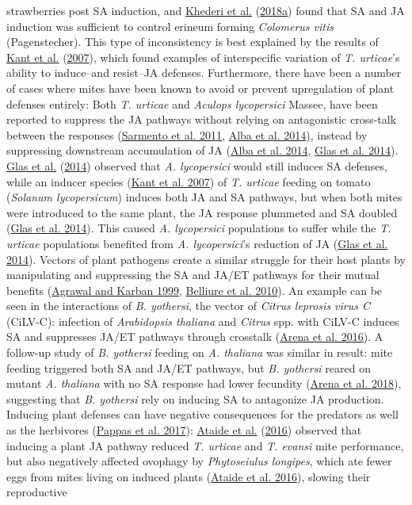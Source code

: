 \documentclass[12pt,final,CPage]{ufthesis}
\begin{document}
{strawberries post SA induction, and \protect\hyperlink{ref-Khederi2018}{Khederi et al.} (\protect\hyperlink{ref-Khederi2018}{2018a}) found that SA and JA induction was sufficient to control erineum forming \emph{Colomerus vitis} (Pagenstecher). This type of inconsistency is best explained by the results of \protect\hyperlink{ref-Kant2007}{Kant et al.} (\protect\hyperlink{ref-Kant2007}{2007}), which found examples of interspecific variation of \emph{T. urticae}'s ability to induce--and resist--JA defenses. Furthermore, there have been a number of cases where mites have been known to avoid or prevent upregulation of plant defenses entirely: Both \emph{T. urticae} and \emph{Aculops lycopersici} Massee, have been reported to suppress the JA pathways without relying on antagonistic cross-talk between the responses (\protect\hyperlink{ref-Sarmento2011}{Sarmento et al. 2011}, \protect\hyperlink{ref-Alba2014}{Alba et al. 2014}), instead by suppressing downstream accumulation of JA (\protect\hyperlink{ref-Alba2014}{Alba et al. 2014}, \protect\hyperlink{ref-Glas2014}{Glas et al. 2014}). \protect\hyperlink{ref-Glas2014}{Glas et al.} (\protect\hyperlink{ref-Glas2014}{2014}) observed that \emph{A. lycopersici} would still induces SA defenses, while an inducer species (\protect\hyperlink{ref-Kant2007}{Kant et al. 2007}) of \emph{T. urticae} feeding on tomato (\emph{Solanum lycopersicum}) induces both JA and SA pathways, but when both mites were introduced to the same plant, the JA response plummeted and SA doubled (\protect\hyperlink{ref-Glas2014}{Glas et al. 2014}). This caused \emph{A. lycopersici} populations to suffer while the \emph{T. urticae} populations benefited from \emph{A. lycopersici}'s reduction of JA (\protect\hyperlink{ref-Glas2014}{Glas et al. 2014}). Vectors of plant pathogens create a similar struggle for their host plants by manipulating and suppressing the SA and JA/ET pathways for their mutual benefits (\protect\hyperlink{ref-Agrawal1999}{Agrawal and Karban 1999}, \protect\hyperlink{ref-Belliure2010}{Belliure et al. 2010}). An example can be seen in the interactions of \emph{B. yothersi}, the vector of \emph{Citrus leprosis virus C} (CiLV-C): infection of \emph{Arabidopsis thaliana} and \emph{Citrus} spp. with CiLV-C induces SA and suppresses JA/ET pathways through crosstalk (\protect\hyperlink{ref-Arena2016}{Arena et al. 2016}). A follow-up study of \emph{B. yothersi} feeding on \emph{A. thaliana} was similar in result: mite feeding triggered both SA and JA/ET pathways, but \emph{B. yothersi} reared on mutant \emph{A. thaliana} with no SA response had lower fecundity (\protect\hyperlink{ref-Arena2018}{Arena et al. 2018}), suggesting that \emph{B. yothersi} rely on inducing SA to antagonize JA production. Inducing plant defenses can have negative consequences for the predators as well as the herbivores (\protect\hyperlink{ref-Pappas2017}{Pappas et al. 2017}): \protect\hyperlink{ref-Ataide2016}{Ataide et al.} (\protect\hyperlink{ref-Ataide2016}{2016}) observed that inducing a plant JA pathway reduced \emph{T. urticae} and \emph{T. evansi} mite performance, but also negatively affected ovophagy by \emph{Phytoseiulus longipes}, which ate fewer eggs from mites living on induced plants (\protect\hyperlink{ref-Ataide2016}{Ataide et al. 2016}), slowing their reproductive }
\end{document}
